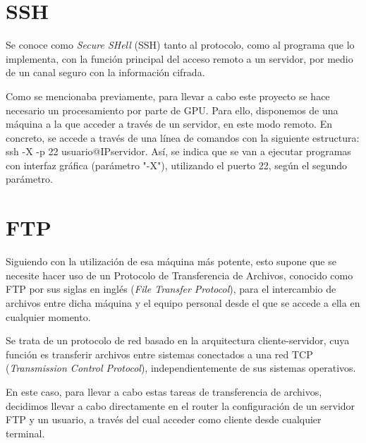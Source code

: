 \section{SSH}

Se conoce como \textit{Secure SHell} (SSH) tanto al protocolo, como al programa que lo implementa, con la función principal del acceso remoto a un servidor, por medio de un canal seguro con la información cifrada. \cite{wiki:ssh}

Como se mencionaba previamente, para llevar a cabo este proyecto se hace necesario un procesamiento por parte de GPU. Para ello, disponemos de una máquina a la que acceder a través de un servidor, en este modo remoto. En concreto, se accede a través de una línea de comandos con la siguiente estructura: ssh -X -p 22 usuario@IPservidor. Así, se indica que se van a ejecutar programas con interfaz gráfica  (parámetro "-X"), utilizando el puerto 22, según el segundo parámetro.


\section{FTP}

Siguiendo con la utilización de esa máquina más potente, esto supone que se necesite hacer uso de un Protocolo de Transferencia de Archivos, conocido como FTP por sus siglas en inglés (\textit{File Transfer Protocol}), para el intercambio de archivos entre dicha máquina y el equipo personal desde el que se accede a ella en cualquier momento.

Se trata de un protocolo de red basado en la arquitectura cliente-servidor, cuya función es transferir archivos entre sistemas conectados a una red TCP (\textit{Transmission Control Protocol}), independientemente de sus sistemas operativos. \cite{wiki:ftp}

En este caso, para llevar a cabo estas tareas de transferencia de archivos, decidimos llevar a cabo directamente en el router la configuración de un servidor FTP y un usuario, a través del cual acceder como cliente desde cualquier terminal.


